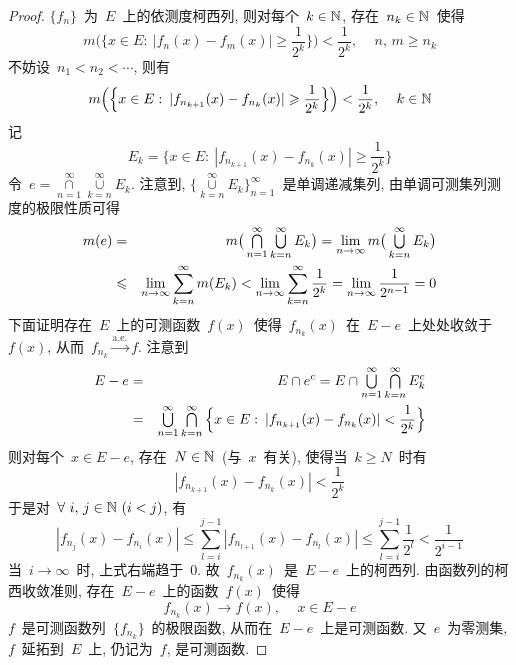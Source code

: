 \begin{proof}
$\{f_n\}$~为~$E$~上的依测度柯西列, 则对每个~$k \in \mathbb{N}$, 存在~$n_k \in \mathbb{N}$~使得
\[
m\Big( \Big\{ x \in E: \: |f_n(x) - f_m(x)| \geqslant \frac{1}{2^k} \Big\} \Big) < \frac{1}{2^k}, \, \quad n,\,m \geqslant n_k
\]
不妨设~$n_1 < n_2 < \cdots$, 则有
\[
m\Big( \Big\{ x \in E: \: |f_{n_{k+1}}(x) - f_{n_k}(x)| \geqslant \frac{1}{2^k} \Big\} \Big) < \frac{1}{2^k}, \, \quad k \in \mathbb{N}
\]
记
\[
E_k = \Big\{x \in E: \: |f_{n_{k+1}}(x) - f_{n_k}(x)| \geqslant \frac{1}{2^k} \Big\}
\]
令~$e = \mathop{\cap}\limits_{n=1}^\infty \mathop{\cup}\limits_{k=n}^\infty E_k$. 注意到, $\big\{ \mathop{\cup}\limits_{k=n}^\infty E_k \big\}_{n=1}^\infty$~是单调递减集列, 由单调可测集列测度的极限性质可得
\begin{eqnarray*}
m(e) &=& m \big(\mathop{\textstyle{\bigcap}}\limits_{n=1}^\infty \mathop{\textstyle{\bigcup}}\limits_{k=n}^\infty E_k \big) = \lim_{n \to \infty} m \big( \mathop{\textstyle{\bigcup}}\limits_{k=n}^\infty E_k \big) \\
&\leqslant& \lim_{n \to \infty} \sum_{k=n}^\infty m(E_k) < \lim_{n \to \infty} \sum_{k=n}^\infty \frac{1}{2^k} = \lim_{n \to \infty} \frac{1}{2^{n-1}} = 0
\end{eqnarray*}
下面证明存在~$E$~上的可测函数~$f(x)$~使得~$f_{n_k}(x)$~在~$E - e$~上处处收敛于~$f(x)$, 从而~$f_{n_k} \xrightarrow{\mathrm{a.e.}} f$. 注意到
\begin{eqnarray*}
E - e &=& E \cap e^c = E \cap \mathop{\textstyle{\bigcup}}\limits_{n=1}^\infty \mathop{\textstyle{\bigcap}}\limits_{k=n}^\infty E^c_k \\
&=& \mathop{\textstyle{\bigcup}}\limits_{n=1}^\infty \mathop{\textstyle{\bigcap}}\limits_{k=n}^\infty \Big\{ x \in E: \: |f_{n_{k+1}}(x) - f_{n_k}(x)| < \frac{1}{2^k} \Big\}
\end{eqnarray*}
则对每个~$x \in E - e$, 存在~$N \in \mathbb{N}$~(与~$x$~有关), 使得当~$k \geqslant N$~时有
\[
|f_{n_{k+1}}(x) - f_{n_k}(x)| < \frac{1}{2^k}
\]
于是对~$\forall~i,\,j \in \mathbb{N}~(i < j)$, 有
\[
|f_{n_j}(x) - f_{n_i}(x)| \leqslant \sum_{l=i}^{j-1} |f_{n_{l+1}}(x) - f_{n_l}(x)| \leqslant \sum_{l=i}^{j-1} \frac{1}{2^l} < \frac{1}{2^{i-1}}
\]
当~$i \to \infty$~时, 上式右端趋于~$0$. 故~$f_{n_k}(x)$~是~$E - e$~上的柯西列. 由函数列的柯西收敛准则, 存在~$E - e$~上的函数~$f(x)$~使得
\[
f_{n_k}(x) \rightarrow f(x), \, \quad x \in E - e
\]
$f$~是可测函数列~$\{f_{n_k}\}$~的极限函数, 从而在~$E - e$~上是可测函数. 又~$e$~为零测集, $f$~延拓到~$E$~上, 仍记为~$f$, 是可测函数.


\end{proof}
